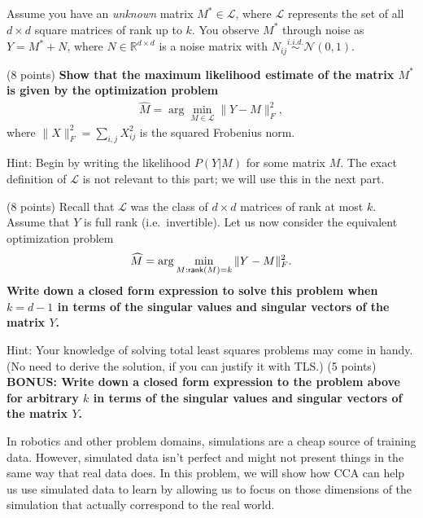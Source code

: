 Assume you have an \emph{unknown} matrix $M^* \in \mathcal{L}$, where $\mathcal{L}$ represents the set of all $d \times d$ square matrices of rank up to $k$. You observe $M^*$ through noise as $Y = M^* + N$, where $N \in \mathbb{R}^{d\times d}$ is a noise matrix with $N_{ij} \stackrel{i.i.d.}{\sim} \mathcal{N}(0,1)$.

\begin{Parts}

\Part (8 points) {\bf Show that the maximum likelihood estimate of the matrix $M^*$ is given by the optimization problem}
\begin{align} 
\widehat{M} = \arg \min_{M \in \mathcal{L}} \|Y - M\|_F^2,
\end{align}
where $\|X\|_F^2 = \sum_{i,j} X_{ij}^2$ is the squared Frobenius norm. 

Hint: Begin by writing the likelihood $P(Y|M)$ for some matrix $M$. The exact definition of $\mathcal{L}$ is not relevant to this part; we will use this in the next part.





\ifexamnosol
\newpage
\fi
\Part (8 points) Recall that $\mathcal{L}$ was the class of $d \times d$ matrices of rank at most $k$. Assume that $Y$ is full rank (i.e.~invertible). Let us now consider the equivalent optimization problem
\begin{align} \label{eq:frobnorm}
\widehat{M} = \arg \min_{M: {\sf rank}(M) = k} \|Y - M\|_F^2.
\end{align}
{\bf Write down a closed form expression to solve this problem when $k = d-1$ in terms of the singular values and singular vectors of the matrix $Y$.}

Hint: Your knowledge of solving total least squares problems may come in handy. (No need to derive the solution, if you can justify it with TLS.)
\ifexamnosol
\newpage
\fi
\Part (5 points) {\bf BONUS: Write down a closed form expression to the problem above for arbitrary $k$ in terms of the singular values and singular vectors of the matrix $Y$.}






\end{Parts}
In robotics and other problem domains, simulations are a cheap source
of training data. However, simulated data isn't perfect and might not
present things in the same way that real data does. In this
problem, we will show how CCA can help us use simulated data to learn
by allowing us to focus on those dimensions of the simulation that
actually correspond to the real world. 

